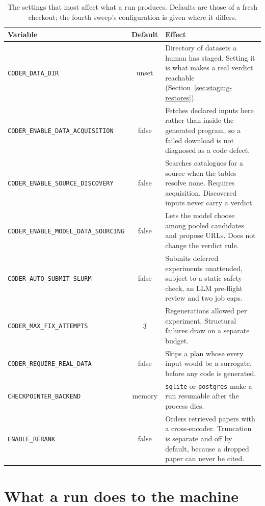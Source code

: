 \begin{table}[htbp]
\centering\small
\caption{The settings that most affect what a run produces. Defaults are those
of a fresh checkout; the fourth sweep's configuration is given where it differs.}
\begin{tabularx}{\textwidth}{lcX}
\toprule
\textbf{Variable} & \textbf{Default} & \textbf{Effect} \\
\midrule
\texttt{CODER\_DATA\_DIR} & unset & Directory of datasets a human has staged. Setting it is what makes a real verdict reachable (Section~\ref{sec:staging-restores}). \\
\texttt{CODER\_ENABLE\_DATA\_ACQUISITION} & false & Fetches declared inputs here rather than inside the generated program, so a failed download is not diagnosed as a code defect. \\
\texttt{CODER\_ENABLE\_SOURCE\_DISCOVERY} & false & Searches catalogues for a source when the tables resolve none. Requires acquisition. Discovered inputs never carry a verdict. \\
\texttt{CODER\_ENABLE\_MODEL\_DATA\_SOURCING} & false & Lets the model choose among pooled candidates and propose URLs. Does not change the verdict rule. \\
\texttt{CODER\_AUTO\_SUBMIT\_SLURM} & false & Submits deferred experiments unattended, subject to a static safety check, an LLM pre-flight review and two job caps. \\
\texttt{CODER\_MAX\_FIX\_ATTEMPTS} & 3 & Regenerations allowed per experiment. Structural failures draw on a separate budget. \\
\texttt{CODER\_REQUIRE\_REAL\_DATA} & false & Skips a plan whose every input would be a surrogate, before any code is generated. \\
\texttt{CHECKPOINTER\_BACKEND} & memory & \texttt{sqlite} or \texttt{postgres} make a run resumable after the process dies. \\
\texttt{ENABLE\_RERANK} & false & Orders retrieved papers with a cross-encoder. Truncation is separate and off by default, because a dropped paper can never be cited. \\
\bottomrule
\end{tabularx}
\end{table}

\section*{What a run does to the machine}

